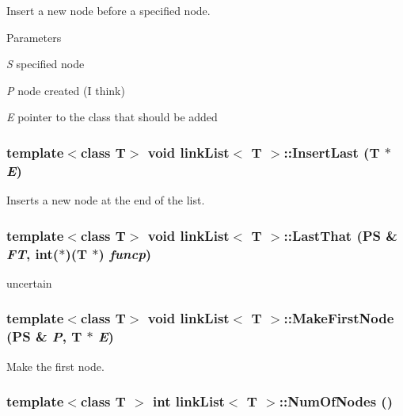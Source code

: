 Insert a new node before a specified node. 
\begin{DoxyParams}{Parameters}
\item[{\em S}]specified node \item[{\em P}]node created (I think) \item[{\em E}]pointer to the class that should be added \end{DoxyParams}
\hypertarget{classlink_list_a5ef6013a096b9065c2c362fcd5113413}{
\subsubsection[{InsertLast}]{\setlength{\rightskip}{0pt plus 5cm}template$<$class T$>$ void {\bf linkList}$<$ T $>$::InsertLast (T $\ast$ {\em E})}}
\label{classlink_list_a5ef6013a096b9065c2c362fcd5113413}


Inserts a new node at the end of the list. \hypertarget{classlink_list_a297739d8d57857ea4e689ab3d41a10a3}{
\subsubsection[{LastThat}]{\setlength{\rightskip}{0pt plus 5cm}template$<$class T$>$ void {\bf linkList}$<$ T $>$::LastThat ({\bf PS} \& {\em FT}, \/  int($\ast$)(T $\ast$) {\em funcp})}}
\label{classlink_list_a297739d8d57857ea4e689ab3d41a10a3}


uncertain \hypertarget{classlink_list_a9e5426ee4036b2eb07b4ce2f20ad07fb}{
\subsubsection[{MakeFirstNode}]{\setlength{\rightskip}{0pt plus 5cm}template$<$class T$>$ void {\bf linkList}$<$ T $>$::MakeFirstNode ({\bf PS} \& {\em P}, \/  T $\ast$ {\em E})}}
\label{classlink_list_a9e5426ee4036b2eb07b4ce2f20ad07fb}


Make the first node. \hypertarget{classlink_list_aee3f890e4e8f48db1518e5114d5bcca8}{
\subsubsection[{NumOfNodes}]{\setlength{\rightskip}{0pt plus 5cm}template$<$class T $>$ int {\bf linkList}$<$ T $>$::NumOfNodes ()}}
\label{classlink_list_aee3f890e4e8f48db1518e5114d5bcca8}


